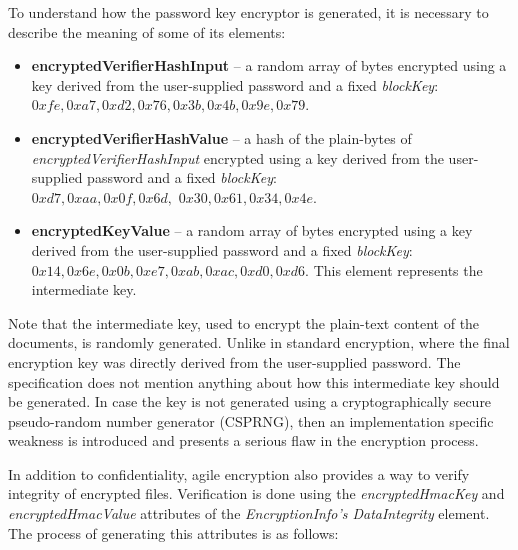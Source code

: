 \documentclass[11pt,oneside]{fithesis2}
\begin{document}
To understand how the password key encryptor is generated, it is necessary to describe the meaning of some of its elements:

\begin{itemize}
\setlength\itemsep{0.1em}
	\item{\textbf{encryptedVerifierHashInput} -- a random array of bytes encrypted using a key derived from the user-supplied password and a fixed \textit{blockKey}: $0xfe, 0xa7, 0xd2, 0x76, 0x3b, 0x4b, 0x9e, 0x79$.} 
	\item{\textbf{encryptedVerifierHashValue} -- a hash of the plain-bytes of \textit{encryptedVerifierHashInput} encrypted using a key derived from the user-supplied password and a fixed \textit{blockKey}:\\ $0xd7, 0xaa, 0x0f, 0x6d,$ $0x30, 0x61, 0x34, 0x4e$.}
	\item{\textbf{encryptedKeyValue} -- a random array of bytes encrypted using a key derived from the user-supplied password and a fixed \textit{blockKey}: $0x14, 0x6e, 0x0b, 0xe7, 0xab, 0xac, 0xd0, 0xd6$. This element represents the intermediate key.}
\end{itemize}

Note that the intermediate key, used to encrypt the plain-text content of the documents, is randomly generated. Unlike in standard encryption, where the final encryption key was directly derived from the user-supplied password. The specification does not mention anything about how this intermediate key should be generated. In case the key is not generated using a cryptographically secure pseudo-random number generator (CSPRNG), then an implementation specific weakness is introduced and presents a serious flaw in the encryption process. 

In addition to confidentiality, agile encryption also provides a way to verify integrity of encrypted files. Verification is done using the \textit{encryptedHmacKey} and \textit{encryptedHmacValue} attributes of the \textit{EncryptionInfo's DataIntegrity} element. The process of generating this attributes is as follows:
\end{document}

